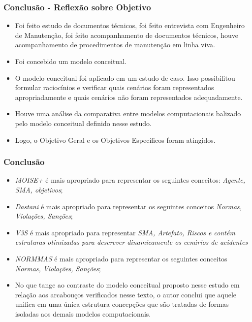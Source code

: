 \documentclass{beamer}
\begin{document}
\begin{frame}
	\frametitle{Conclusão - Reflexão sobre Objetivo}
	\begin{itemize} 
		\item Foi feito estudo de documentos técnicos, foi feito entrevista com Engenheiro de Manutenção, foi feito acompanhamento de documentos técnicos, houve acompanhamento de procedimentos de manutenção em linha viva.
		\item Foi concebido um modelo conceitual.
		\item O modelo conceitual foi aplicado em um estudo de caso. Isso possibilitou formular raciocínios e verificar quais cenários foram representados apropriadamente e quais cenários não foram representados adequadamente.
		\item Houve uma análise da comparativa entre modelos computacionais balizado pelo modelo conceitual definido nesse estudo.
		\item Logo, o Objetivo Geral e os Objetivos Específicos foram atingidos.    
	\end{itemize}
\end{frame}

\begin{frame}
	\frametitle{Conclusão}
	\begin{itemize}
		\item \textit{MOISE+} é mais apropriado para representar os seguintes conceitos: \textit{Agente, SMA, objetivos};
		\item \textit{Dastani} é mais apropriado para representar os seguintes conceitos \textit{Normas, Violações, Sanções};
		\item \textit{V3S} é mais apropriado para representar \textit{SMA, Artefato, Riscos e contém estruturas otimizadas para descrever dinamicamente os cenários de acidentes}
		\item \textit{NORMMAS} é mais apropriado para representar os seguintes conceitos \textit{Normas, Violações, Sanções};
		\item No que tange ao contraste do modelo conceitual proposto nesse estudo em relação aos arcabouços verificados nesse texto, o autor conclui que aquele unifica em uma única estrutura concepções que são tratadas de formas isoladas aos demais modelos computacionais.
	\end{itemize}
\end{frame}
\end{document}
